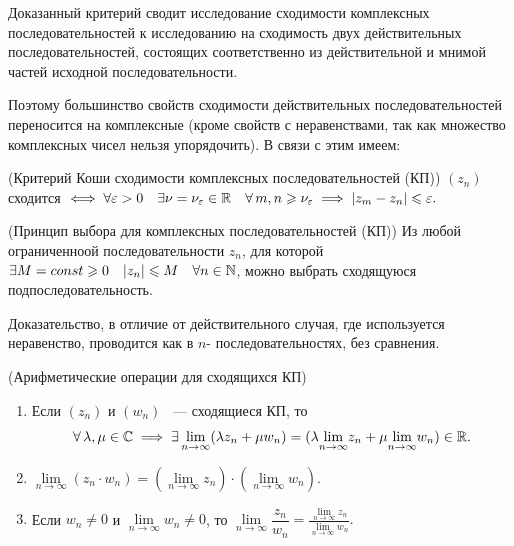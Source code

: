 \documentclass[../../main.tex]{subfiles}
\begin{document}
\begin{rem}
	Доказанный критерий сводит исследование сходимости комплексных
	 последовательностей к исследованию на сходимость двух действительных
	 последовательностей, состоящих соответственно из действительной и мнимой
	 частей исходной последовательности.
	
	Поэтому большинство свойств сходимости действительных последовательностей 
	 переносится на комплексные (кроме свойств с неравенствами, так как множество
	 комплексных чисел нельзя упорядочить). В связи с этим имеем:
\end{rem}
	\begin{thm}(Критерий Коши сходимости комплексных последовательностей (КП))
		$ (z_n) $ сходится $ \iff \forall \varepsilon > 0\quad \exists \nu = \nu_\varepsilon 
		\in \mathbb{R} \quad \forall\, m, n \geqslant \nu_\varepsilon \implies |z_m - z_n| \leqslant \varepsilon.$
	\end{thm} 

	\begin{thm}(Принцип выбора для комплексных последовательностей (КП))		
		Из любой ограниченноой последовательности $ z_n $, для которой $ \exists M = 
		const \geqslant 0 \quad |z_n| \leqslant M\quad \forall n \in \mathbb{N} $, можно выбрать сходящуюся 
		подпоследовательность.
	\end{thm}
	
		Доказательство, в отличие от действительного случая, где используется 
		неравенство, проводится как в $n$- последовательностях, без 
		сравнения.

	\begin{thm}(Арифметические операции для сходящихся КП)
		\begin{enumerate}
			\item Если $ (z_n) $ и $ (w_n) $ ~--- сходящиеся КП, то \[ \forall\, 
			\lambda, \mu \in \mathbb{C} \implies
			\exists\, \underset{n \to \infty}{\lim} (\lambda z_n + \mu w_n) = 
			(\lambda \underset{n \to \infty}{\lim}z_n + \mu \underset{n \to 
			\infty}{\lim}w_n) \in \mathbb{R}. \]
			
			\item $ \underset{n \to \infty}{\lim} (z_n \cdot w_n) = \left(\underset{n \to 
			\infty}{\lim} z_n\right)\cdot\left(\underset{n \to \infty}{\lim} w_n\right).$
			
			\item Если $ w_n \neq 0 $ и $ \underset{n \to \infty}{\lim} w_n 
			\neq 0 $, то $ \underset{n \to \infty}{\lim} \dfrac{z_n}{w_n} = 
			\frac{\underset{n \to \infty}{\lim} z_n}{\underset{n \to \infty}{\lim} w_n}.
			$
		\end{enumerate}
	\end{thm}
\end{document}
